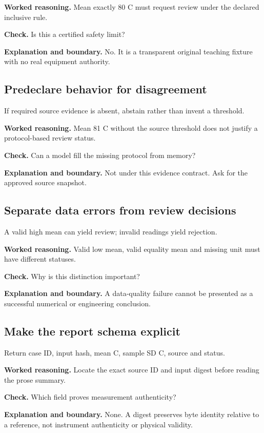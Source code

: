 \textbf{Worked reasoning.} Mean exactly 80 C must request review under the declared inclusive rule.

\textbf{Check.} Is this a certified safety limit?

\textbf{Explanation and boundary.} No. It is a transparent original teaching fixture with no real equipment authority.

\subsection{Predeclare behavior for disagreement}
If required source evidence is absent, abstain rather than invent a threshold.

\textbf{Worked reasoning.} Mean 81 C without the source threshold does not justify a protocol-based review status.

\textbf{Check.} Can a model fill the missing protocol from memory?

\textbf{Explanation and boundary.} Not under this evidence contract. Ask for the approved source snapshot.

\subsection{Separate data errors from review decisions}
A valid high mean can yield review; invalid readings yield rejection.

\textbf{Worked reasoning.} Valid low mean, valid equality mean and missing unit must have different statuses.

\textbf{Check.} Why is this distinction important?

\textbf{Explanation and boundary.} A data-quality failure cannot be presented as a successful numerical or engineering conclusion.

\subsection{Make the report schema explicit}
Return case ID, input hash, mean C, sample SD C, source and status.

\textbf{Worked reasoning.} Locate the exact source ID and input digest before reading the prose summary.

\textbf{Check.} Which field proves measurement authenticity?

\textbf{Explanation and boundary.} None. A digest preserves byte identity relative to a reference, not instrument authenticity or physical validity.

